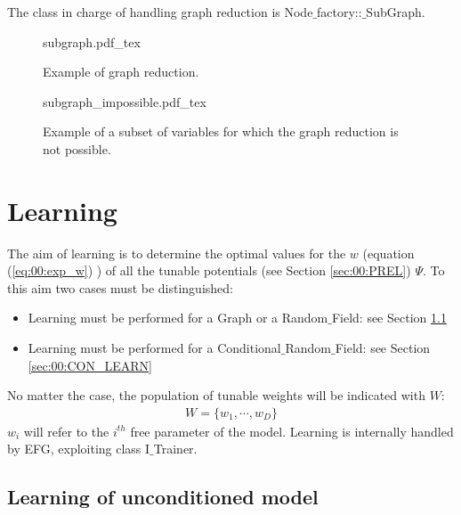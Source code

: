 The class in charge of handling graph reduction is Node$\_$factory::$\_$SubGraph.

\begin{figure}
	\centering
\def\svgwidth{0.7 \textwidth}
{subgraph.pdf_tex}
	\caption{Example of graph reduction.}
	\label{fig:00:subgraph}
\end{figure} 

\begin{figure}
	\centering
\def\svgwidth{0.2 \textwidth}
{subgraph_impossible.pdf_tex}
	\caption{Example of a subset of variables for which the graph reduction is not possible.}
	\label{fig:00:subgraph_impossible}
\end{figure} 

\section{Learning}
\label{sec:00:LEARN}

The aim of learning is to determine the optimal values for the $w$ (equation (\ref{eq:00:exp_w}) ) of all the tunable potentials (see Section \ref{sec:00:PREL}) $\Psi$.
To this aim two cases must be distinguished:
\begin{itemize}
\item Learning must be performed for a Graph or a Random$\_$Field: see Section \ref{sec:00:UNC_LEARN}
\item Learning must be performed for a Conditional$\_$Random$\_$Field: see Section \ref{sec:00:CON_LEARN} 
\end{itemize}
No matter the case, the population of tunable weights will be indicated with $W$:
\begin{eqnarray}
W = \lbrace w_1,\cdots , w_D \rbrace
\end{eqnarray}
$w_i$ will refer to the $i^{th}$ free parameter of the model.
Learning is internally handled by EFG, exploiting class I$\_$Trainer.

\subsection{Learning of unconditioned model}
\label{sec:00:UNC_LEARN}

